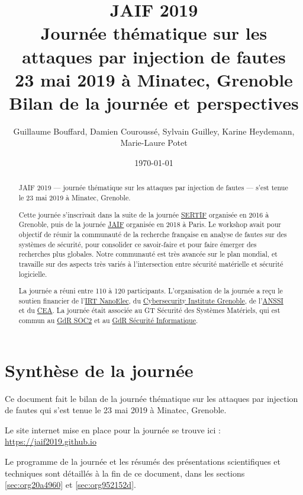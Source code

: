 \documentclass[a4paper,11pt]{article}
\author{Guillaume Bouffard,  Damien Couroussé, Sylvain Guilley,  Karine Heydemann, Marie-Laure Potet}
\date{\today}
\title{JAIF 2019 \\ Journée thématique sur les attaques par injection de fautes \\ 23 mai 2019 à Minatec, Grenoble\\\medskip
\large Bilan de la journée et perspectives}
\begin{document}
\maketitle
\setcounter{tocdepth}{1}
\tableofcontents

\begin{abstract}
JAIF 2019 --- journée thématique sur les attaques par injection de
fautes --- s'est tenue le 23 mai 2019 à Minatec, Grenoble.

Cette journée s’inscrivait dans la suite de la journée \href{https://lazart.gricad-pages.univ-grenoble-alpes.fr/sertif/pages/workshop.html}{SERTIF} organisée
en 2016 à Grenoble,
puis de la journée \href{https://wp-systeme.lip6.fr/jaif}{JAIF} organisée en 2018 à Paris.
Le workshop avait pour objectif de réunir la communauté de la
recherche française en analyse de fautes sur des systèmes de sécurité,
pour consolider ce savoir-faire et pour faire émerger des recherches
plus globales.  Notre communauté est très avancée sur le plan mondial,
et travaille sur des aspects très variés à l'intersection entre
sécurité matérielle et sécurité logicielle.

La journée a réuni entre 110 à 120 participants.  L'organisation de la
journée a reçu le soutien financier de l'\href{http://www.irtnanoelec.fr}{IRT NanoElec}, du
\href{https://cybersecurity.univ-grenoble-alpes.fr/}{Cybersecurity Institute Grenoble}, de l'\href{https://www.ssi.gouv.fr}{ANSSI} et du \href{http://www.cea-tech.fr}{CEA}.  La journée
était associée au GT Sécurité des Systèmes Matériels, qui est commun
au \href{http://www.gdr-soc.cnrs.fr}{GdR SOC2} et au \href{https://gdr-securite.irisa.fr}{GdR Sécurité Informatique}.
\end{abstract}

\section{Synthèse de la journée}
\label{sec:org374bd6e}

Ce document fait le bilan de la journée thématique sur les attaques
par injection de fautes qui s'est tenue le 23 mai 2019 à Minatec, Grenoble.

Le site internet mise en place pour la journée se trouve ici :
\url{https://jaif2019.github.io}

Le programme de la journée et les résumés des présentations
scientifiques et techniques sont détaillés à la fin de ce document,
dans les sections \ref{sec:org20a4960} et \ref{sec:org952152d}.
\end{document}
